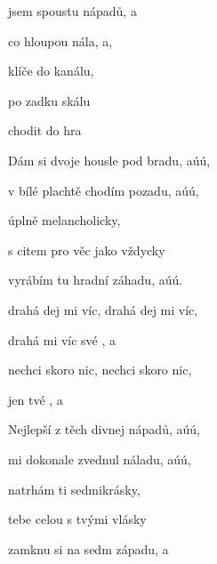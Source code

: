 

\zs
{} jsem spoustu nápadů, a

co  hloupou nála, a,

 klíče do kanálu,

 po zadku  skálu

 chodit  do hra
\ks

\zs
Dám si dvoje housle pod bradu, aúú,

v bílé plachtě chodím pozadu, aúú,

úplně melancholicky,

s citem pro věc jako vždycky

vyrábím tu hradní záhadu, aúú. 
\ks

\zr
{} drahá dej mi víc,  drahá dej mi víc,

 drahá  mi víc své , a

 nechci skoro nic,  nechci skoro nic,

 jen  tvé , a
\kr

\zs
Nejlepší z těch divnej nápadů, aúú,

mi dokonale zvednul náladu, aúú,

natrhám ti sedmikrásky,

tebe celou s tvými vlásky

zamknu si na sedm západu, a
\ks

\zr  \kr

\kp





